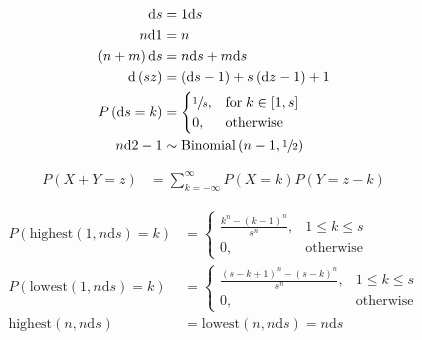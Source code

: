 \documentclass{article}
\newcommand\p[1]{\left( #1 \right)}
\renewcommand{\d}{\text{d}}
\begin{document}
\begin{align}
    \d s        & = 1\d s                                                  \\
    n\d 1       & = n                                                      \\
    \p{n+m}\d s & = n\d s + m\d s                                          \\
    \d \p{sz}   & = \p{\d s - 1} + s\p{\d z - 1} + 1                       \\
    P\p{\d s=k} & = \begin{cases}
                        \sfrac{1}{s}, & \text{for}\; k \in \left[ 1, s \right] \\
                        0,            & \text{otherwise}
                    \end{cases} \\
    n\d 2 - 1   & \sim \text{Binomial}\p{n-1, \sfrac{1}{2}}
\end{align}

\begin{align}
    P(X+Y=z) & =\sum_{k=-\infty }^{\infty }P(X=k)P(Y=z-k)
\end{align}

\begin{align}
    P\p{\text{highest}\p{1, n\d s}=k} & = \begin{cases}
                                              \frac{k^n-\p{k-1}^n}{s^n}, & 1\leq k\leq s    \\
                                              0,                         & \text{otherwise}
                                          \end{cases}                      \\
    P\p{\text{lowest}\p{1, n\d s}=k}  & = \begin{cases}
                                              \frac{\p{s-k+1}^n-\p{s-k}^n}{s^n}, & 1\leq k\leq s    \\
                                              0,                                 & \text{otherwise}
                                          \end{cases} \\
    \text{highest}\p{n, n\d s}        & = \text{lowest}\p{n, n\d s} = n\d s
\end{align}
\end{document}

